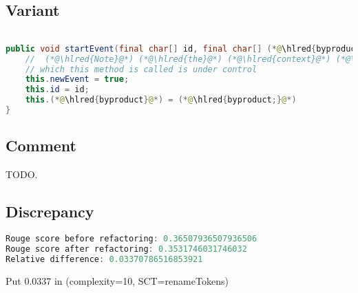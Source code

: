 \documentclass[11pt]{article}
\DeclareRobustCommand{\hlred}[1]{{\sethlcolor{YellowOrange}\hl{#1}}}
\begin{document}
\subsection{Variant}

\begin{lstlisting}[language=java]

public void startEvent(final char[] id, final char[] (*@\hlred{byproduct}@*)) {
    //  (*@\hlred{Note}@*) (*@\hlred{the}@*) (*@\hlred{context}@*) (*@\hlred{in}@*) (*@\hlred{that }@*)this (*@\hlred{method}@*) (*@\hlred{or}@*) (*@\hlred{context}@*) (*@\hlred{in}@*) (*@\hlred{other}@*) (*@\hlred{code}@*) is (*@\hlred{ignored}@*) (*@\hlred{since}@*) (*@\hlred{only}@*) (*@\hlred{that}@*) (*@\hlred{method called}@*)
    // which this method is called is under control
    this.newEvent = true;
    this.id = id;
    this.(*@\hlred{byproduct}@*) = (*@\hlred{byproduct;}@*)
}
\end{lstlisting}

\subsection{Comment}

TODO.

\subsection{Discrepancy}

\begin{lstlisting}[language=java]
Rouge score before refactoring: 0.36507936507936506
Rouge score after refactoring: 0.3531746031746032
Relative difference: 0.03370786516853921
\end{lstlisting}

Put 0.0337 in (complexity=10, SCT=renameTokens)
\end{document}
